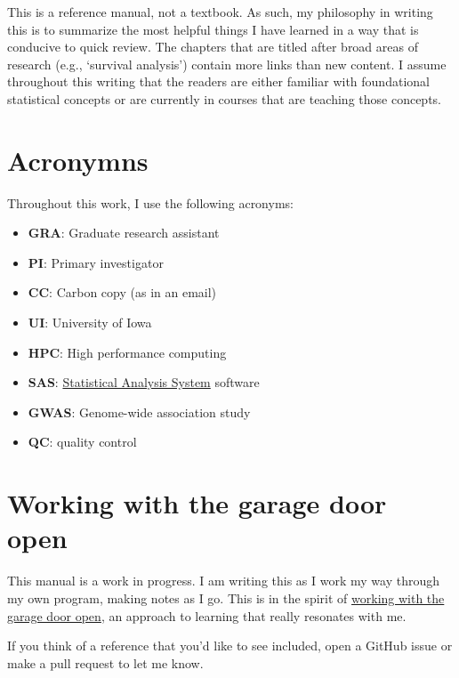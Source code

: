 \documentclass[
]{book}
\providecommand{\tightlist}{%
  \setlength{\itemsep}{0pt}\setlength{\parskip}{0pt}}
\begin{document}
This is a reference manual, not a textbook. As such, my philosophy in writing this is to summarize the most helpful things I have learned in a way that is conducive to quick review. The chapters that are titled after broad areas of research (e.g., `survival analysis') contain more links than new content. I assume throughout this writing that the readers are either familiar with foundational statistical concepts or are currently in courses that are teaching those concepts.

\hypertarget{acronyms}{%
\section{Acronymns}\label{acronyms}}

Throughout this work, I use the following acronyms:

\begin{itemize}
\tightlist
\item
  \textbf{GRA}: Graduate research assistant
\item
  \textbf{PI}: Primary investigator
\item
  \textbf{CC}: Carbon copy (as in an email)
\item
  \textbf{UI}: University of Iowa
\item
  \textbf{HPC}: High performance computing
\item
  \textbf{SAS}: \href{https://en.wikipedia.org/wiki/SAS_(software)}{Statistical Analysis System} software
\item
  \textbf{GWAS}: Genome-wide association study
\item
  \textbf{QC}: quality control
\end{itemize}

\hypertarget{working-with-the-garage-door-open}{%
\section{Working with the garage door open}\label{working-with-the-garage-door-open}}

This manual is a work in progress. I am writing this as I work my way through my own program, making notes as I go. This is in the spirit of \href{https://notes.andymatuschak.org/About_these_notes?stackedNotes=z21cgR9K3UcQ5a7yPsj2RUim3oM2TzdBByZu}{working with the garage door open}, an approach to learning that really resonates with me.

If you think of a reference that you'd like to see included, open a GitHub issue or make a pull request to let me know.
\end{document}
